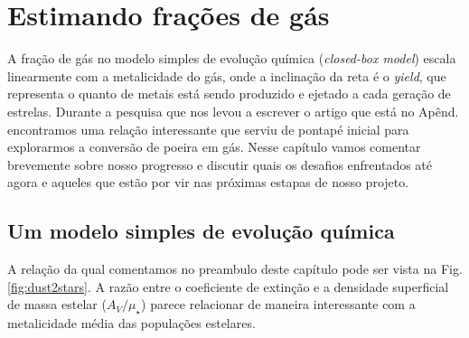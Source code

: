 



\chapter{Estimando frações de gás}
\label{sec:gasfrac}

A fração de gás no modelo simples de evolução química ({\em closed-box model}) escala linearmente
com a metalicidade do gás, onde a inclinação da reta é o {\em yield}, que representa o quanto de
metais está sendo produzido e ejetado a cada geração de estrelas. Durante a pesquisa que nos levou a
escrever o artigo que está no Apênd. \label{apendice:GDetal2014b} encontramos uma relação
interessante que serviu de pontapé inicial para explorarmos a conversão de poeira em gás. Nesse
capítulo vamos comentar brevemente sobre nosso progresso e discutir quais os desafios enfrentados
até agora e aqueles que estão por vir nas próximas estapas de nosso projeto.

\section{Um modelo simples de evolução química}
\label{sec:gasfrac:closedbox}

A relação da qual comentamos no preambulo deste capítulo pode ser vista na Fig.
\ref{fig:dust2stars}. A razão entre o coeficiente de extinção e a densidade superficial de massa
estelar ($A_V / \mu_\star$) parece relacionar de maneira interessante com a metalicidade média das
populações estelares. 

